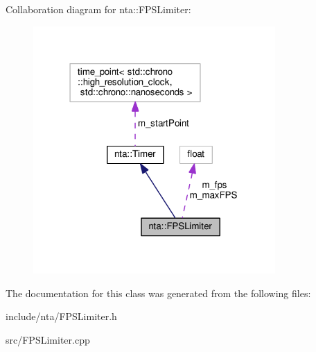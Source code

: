 Collaboration diagram for nta\+:\+:F\+P\+S\+Limiter\+:\nopagebreak
\begin{figure}[H]
\begin{center}
\leavevmode
\includegraphics[width=262pt]{de/da2/classnta_1_1FPSLimiter__coll__graph}
\end{center}
\end{figure}


The documentation for this class was generated from the following files\+:\begin{DoxyCompactItemize}
\item 
include/nta/F\+P\+S\+Limiter.\+h\item 
src/F\+P\+S\+Limiter.\+cpp\end{DoxyCompactItemize}
